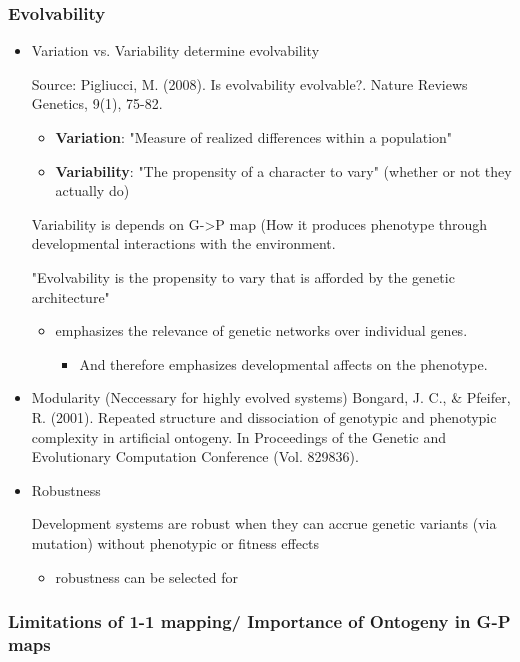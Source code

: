 \documentclass[11pt]{article}
\begin{document}
\subsubsection*{Evolvability}
\label{sec:orgheadline10}
\begin{itemize}
\item Variation vs. Variability determine evolvability
\label{sec:orgheadline7}

Source: Pigliucci, M. (2008). Is evolvability evolvable?. Nature Reviews Genetics, 9(1), 75-82.
\begin{itemize}
\item \textbf{Variation}:  "Measure of realized differences within a population"
\item \textbf{Variability}: "The propensity of a character to vary" (whether or not they actually do)
\end{itemize}
Variability is depends on G->P map (How it produces phenotype through developmental interactions
with the environment.

"Evolvability is the propensity to vary that is afforded by the genetic architecture"
\begin{itemize}
\item emphasizes the relevance of genetic networks over individual genes.
\begin{itemize}
\item And therefore emphasizes developmental affects on the phenotype.
\end{itemize}
\end{itemize}
\item Modularity (Neccessary for highly evolved systems)
\label{sec:orgheadline8}
Bongard, J. C., \& Pfeifer, R. (2001). Repeated structure and dissociation of genotypic and phenotypic complexity in artificial ontogeny. In Proceedings of the Genetic and Evolutionary Computation Conference (Vol. 829836).
\item Robustness
\label{sec:orgheadline9}

Development systems are robust when they can accrue  genetic variants (via mutation) without phenotypic or fitness effects
\begin{itemize}
\item robustness can be selected for
\end{itemize}
\end{itemize}
\subsubsection*{Limitations of 1-1 mapping/ Importance of Ontogeny in G-P maps}
\label{sec:orgheadline11}
\end{document}
